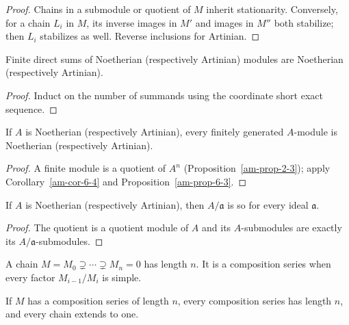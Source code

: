 \begin{proof}
Chains in a submodule or quotient of $M$ inherit stationarity.  Conversely,
for a chain $L_i$ in $M$, its inverse images in $M'$ and images in $M''$ both
stabilize; then $L_i$ stabilizes as well.  Reverse inclusions for Artinian.
\end{proof}
\begin{corollary}
\label{am-cor-6-4}
\uses{}
Finite direct sums of Noetherian (respectively Artinian) modules are Noetherian
(respectively Artinian).
\end{corollary}
\begin{proof}
Induct on the number of summands using the coordinate short exact sequence.
\end{proof}
\begin{proposition}
\label{am-prop-6-5}
\uses{}
If $A$ is Noetherian (respectively Artinian), every finitely generated
$A$-module is Noetherian (respectively Artinian).
\end{proposition}
\begin{proof}
A finite module is a quotient of $A^n$ (Proposition~\ref{am-prop-2-3}); apply
Corollary~\ref{am-cor-6-4} and Proposition~\ref{am-prop-6-3}.
\end{proof}
\begin{proposition}
\label{am-prop-6-6}
\uses{}
If $A$ is Noetherian (respectively Artinian), then $A/\mathfrak{a}$ is so for every
ideal $\mathfrak{a}$.
\end{proposition}
\begin{proof}
The quotient is a quotient module of $A$ and its $A$-submodules are exactly its
$A/\mathfrak{a}$-submodules.
\end{proof}
\begin{definition}
\label{am-def-composition-series}
\uses{}
A chain $M=M_0\supsetneq\cdots\supsetneq M_n=0$ has length $n$.  It is a
composition series when every factor $M_{i-1}/M_i$ is simple.
\end{definition}
\begin{proposition}
\label{am-prop-6-7}
\uses{}
If $M$ has a composition series of length $n$, every composition series has
length $n$, and every chain extends to one.
\end{proposition}
